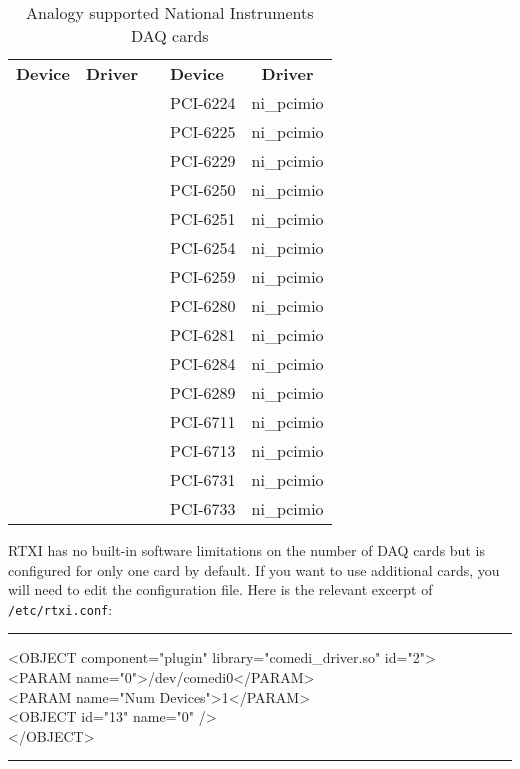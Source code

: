 \begin{fullpage}
\begin{table}
\caption{Analogy supported National Instruments DAQ cards}
\label{ANALOGY NI}
\begin{center}
\vspace{.5cm}
\begin{tabular}{lcclc}
\textbf{Device} & \textbf{Driver} & & \textbf{Device} & \textbf{Driver}\\
& & & PCI-6224 & ni\_pcimio\\ 
& & & PCI-6225 & ni\_pcimio\\ 
& & & PCI-6229 & ni\_pcimio\\ 
& & & PCI-6250 & ni\_pcimio\\ 
& & & PCI-6251 & ni\_pcimio\\ 
& & & PCI-6254 & ni\_pcimio\\ 
& & & PCI-6259 & ni\_pcimio\\ 
& & & PCI-6280 & ni\_pcimio\\ 
& & & PCI-6281 & ni\_pcimio\\ 
& & & PCI-6284 & ni\_pcimio\\ 
& & & PCI-6289 & ni\_pcimio\\ 
& & & PCI-6711 & ni\_pcimio\\ 
& & & PCI-6713 & ni\_pcimio\\ 
& & & PCI-6731 & ni\_pcimio\\ 
& & & PCI-6733 & ni\_pcimio\\ 
\end{tabular}
\end{center}
\end{table}
\end{fullpage}

\label{more DAQ cards}\attention RTXI has no built-in software limitations on the number of DAQ cards but is configured for only one card by default. If you want to use additional cards, you will need to edit the configuration file. Here is the relevant excerpt of \texttt{/etc/rtxi.conf}:
\begin{example}
\bigskip\hrule\smallskip
<OBJECT component="plugin" library="comedi\_driver.so" id="2">\\
<PARAM name="0">/dev/comedi0</PARAM>\\
<PARAM name="Num Devices">1</PARAM>\\
<OBJECT id="13" name="0" />\\
</OBJECT>
\bigskip\hrule\bigskip
\end{example}


